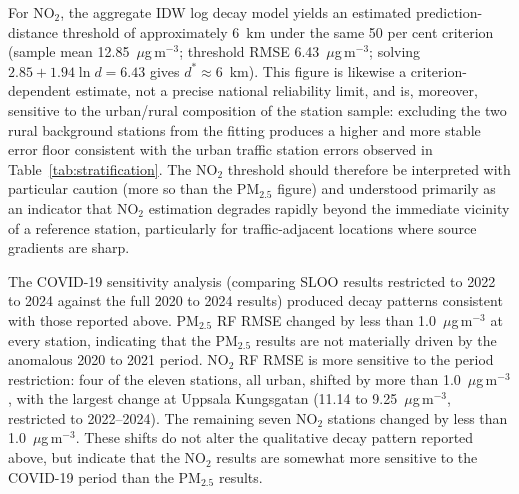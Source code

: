\documentclass[11pt,a4paper]{article}
\begin{document}
For NO$_2$, the aggregate IDW log decay model yields an estimated prediction-distance threshold of approximately 6~km under the same 50 per cent criterion (sample mean 12.85~$\mu$g\,m$^{-3}$; threshold RMSE 6.43~$\mu$g\,m$^{-3}$; solving $2.85 + 1.94\ln d = 6.43$ gives $d^* \approx 6$~km). This figure is likewise a criterion-dependent estimate, not a precise national reliability limit, and is, moreover, sensitive to the urban/rural composition of the station sample: excluding the two rural background stations from the fitting produces a higher and more stable error floor consistent with the urban traffic station errors observed in Table~\ref{tab:stratification}. The NO$_2$ threshold should therefore be interpreted with particular caution (more so than the PM$_{2.5}$ figure) and understood primarily as an indicator that NO$_2$ estimation degrades rapidly beyond the immediate vicinity of a reference station, particularly for traffic-adjacent locations where source gradients are sharp.

The COVID-19 sensitivity analysis (comparing SLOO results restricted to 2022 to 2024 against the full 2020 to 2024 results) produced decay patterns consistent with those reported above. PM$_{2.5}$ RF RMSE changed by less than 1.0~$\mu$g\,m$^{-3}$ at every station, indicating that the PM$_{2.5}$ results are not materially driven by the anomalous 2020 to 2021 period. NO$_2$ RF RMSE is more sensitive to the period restriction: four of the eleven stations, all urban, shifted by more than 1.0~$\mu$g\,m$^{-3}$, with the largest change at Uppsala Kungsgatan (11.14 to 9.25~$\mu$g\,m$^{-3}$, restricted to 2022--2024). The remaining seven NO$_2$ stations changed by less than 1.0~$\mu$g\,m$^{-3}$. These shifts do not alter the qualitative decay pattern reported above, but indicate that the NO$_2$ results are somewhat more sensitive to the COVID-19 period than the PM$_{2.5}$ results.
\end{document}
